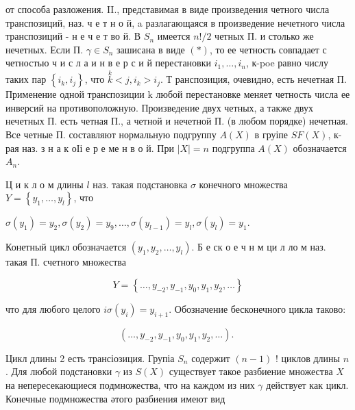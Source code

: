 \documentclass[10pt]{article}
\begin{document}
от способа разложения. II., представимая в виде произведения четного числа транспозиций, наз. ч е т н о й, a разлагающаяся в произведение нечетного числа транспозиций - н е ч е т во й. В $S_{n}$ имеется $n ! / 2$ четных П. и столько же нечетных. Если П. $\gamma \in S_{n}$ зашисана в виде $(*)$, то ее четность совпадает с четностью ч и с л а и н в е р с и й перестановки $i_{1}, \ldots, i_{n}$, к-poe равно числу таких пар $\left\{i_{k}, i_{j}\right\}$, что $\stackrel{k}{k}<j, i_{k}>i_{j}$. Т ранспозиция, очевидно, есть нечетная П. Применение одной транспозиции $\mathrm{k}$ любой перестановке меняет четность числа ее инверсий на противоположную. Произведение двух четных, а также двух нечетных П. есть четная П., а четной и нечетной П. (в любом порядке) нечетная. Все четные П. составляют нормальную подгруппу $A(X)$ в груіпе $S F(X)$, к-рая наз. з н а к оІі е р е ме н в о й. При $|X|=n$ подгруппа $A(X)$ обозначается $A_{n}$.



Ц и к л о м длины $l$ наз. такая подстановка $\sigma$ конечного множества $Y=\left\{y_{1}, \ldots, y_{l}\right\}$, что



$\sigma\left(y_{1}\right)=y_{2}, \sigma\left(y_{2}\right)=y_{9}, \ldots, \sigma\left(y_{l-1}\right)=y_{l}, \sigma\left(y_{l}\right)=y_{1}$.



Конетный цикл обозначается $\left(y_{1}, y_{2}, \ldots, y_{l}\right)$. Б е ск о е ч н м ци л ло м наз. такая П. счетного множества



\[

Y=\left\{\ldots, y_{-2}, y_{-1}, y_{0}, y_{1}, y_{2}, \ldots\right\}

\]



что для любого целого $i \sigma\left(y_{i}\right)=y_{i+1}$. Обозначение бесконечного цикла таково:



\[

\left(\ldots, y_{-2}, y_{-1}, y_{0}, y_{1}, y_{2}, \ldots\right) \text {. }

\]



Цикл длины 2 есть трансіозиция. Групіа $S_{n}$ содержит $(n-1)$ ! циклов длины $n$. Для любой подстановки $\gamma$ из $S(X)$ существует такое разбиение множества $X$ на непересекающиеся подмножества, что на каждом из них $\gamma$ действует как цикл. Конечные подмножества әтого разбиения имеют вид
\end{document}
